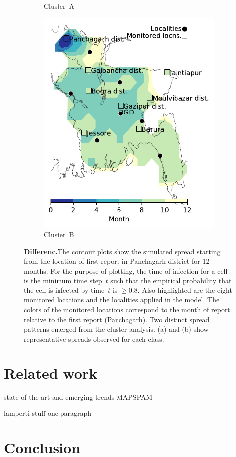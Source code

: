 \documentclass{article}
\begin{document}
\begin{figure}[!t]
\begin{subfigure}[b]{.32\textwidth}
    \caption{Cluster~A \label{fig:bgdClassA}}
\end{subfigure}\hspace{.25cm}
\begin{subfigure}[b]{.32\textwidth}
    \includegraphics[width=\textwidth]{../cellular_automata/results/contour/BGD_model-B_m1_l3.pdf}
    \caption{Cluster~B \label{fig:bgdClassB1}}
\end{subfigure}
\caption{\textbf{Differenc.}The contour plots show the simulated
spread starting from the location of first report in Panchagarh district
for 12 months. For the purpose of plotting, the time of infection for a
cell is the minimum time step~$t$ such that the empirical probability that
the cell is infected by time~$t$ is $\ge0.8$. Also highlighted are the
eight monitored locations and the localities applied in the model. The
colors of the monitored locations correspond to the month of report
relative to the first report (Panchagarh). Two distinct spread patterns
emerged from the cluster analysis. (a) and (b) show representative spreads
observed for each class.}
\end{figure}

\section{Related work}
state of the art and emerging trends
MAPSPAM

lamperti stuff one paragraph

\section{Conclusion}



\end{document}
